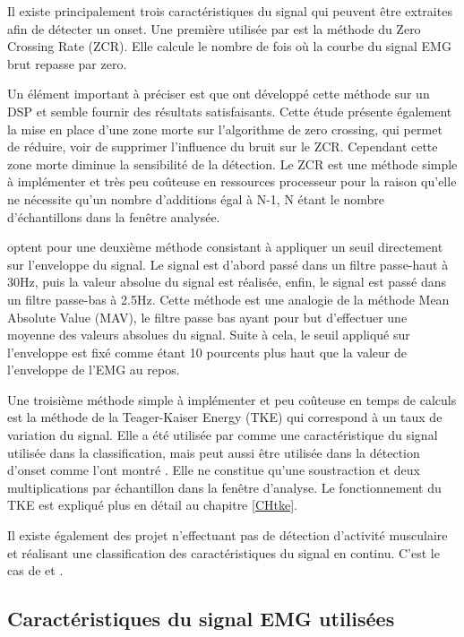 \documentclass[letterpaper, twoside, 12pt, memoire, creativecommons, hyperref]{thETS}
\begin{document}
Il existe principalement trois caractéristiques du signal qui peuvent être extraites afin de détecter un onset. Une première utilisée par \cite{Chang1996}est la méthode du Zero Crossing Rate (ZCR). Elle calcule le nombre de fois où la courbe du signal EMG brut repasse par zero. 

Un élément important à préciser est que \cite{Chang1996} ont développé cette méthode sur un DSP et semble fournir des résultats satisfaisants. Cette étude présente également la mise en place d’une zone morte sur l’algorithme de zero crossing, qui permet de réduire, voir de supprimer l’influence du bruit sur le ZCR. Cependant cette zone morte diminue la sensibilité de la détection.
Le ZCR est une méthode simple à implémenter et très peu coûteuse en ressources processeur pour la raison qu’elle ne nécessite qu’un nombre d’additions égal à N-1, N étant le nombre d’échantillons dans la fenêtre analysée. 

\cite{Peleg2002} optent pour une deuxième méthode consistant à appliquer un seuil directement sur l’enveloppe du signal. Le signal est d’abord passé dans un filtre passe-haut à 30Hz, puis la valeur absolue du signal est réalisée, enfin, le signal est passé dans un filtre passe-bas à 2.5Hz. Cette méthode est une analogie de la méthode Mean Absolute Value (MAV), le filtre passe bas ayant pour but d’effectuer une moyenne des valeurs absolues du signal. Suite à cela, le seuil appliqué sur l’enveloppe est fixé comme étant 10 pourcents plus haut que la valeur de l’enveloppe de l’EMG au repos. 

Une troisième méthode simple à implémenter et peu coûteuse en temps de calculs est la méthode de la Teager-Kaiser Energy (TKE) qui correspond à un taux de variation du signal. Elle a été utilisée par \cite{Maheu2011} comme une caractéristique du signal utilisée dans la classification, mais peut aussi être utilisée dans la détection d’onset comme l'ont montré \cite{li2007}. Elle ne constitue qu’une soustraction et deux multiplications par échantillon dans la fenêtre d’analyse. Le fonctionnement du TKE est expliqué plus en détail au chapitre \ref{CHtke}.

Il existe également des projet n'effectuant pas de détection d'activité musculaire et réalisant une classification des caractéristiques du signal en continu. C'est le cas de \cite{Englehart2003} et \cite{Tenore2007}.

\subsection{Caractéristiques du signal EMG utilisées}
\end{document}
